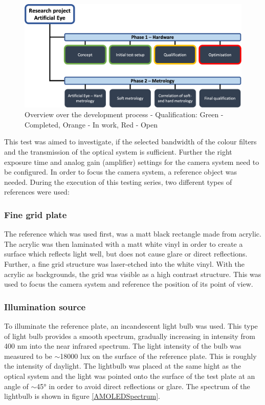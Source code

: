 \begin{figure}[h]
\begin{center}
\includegraphics[width=12cm]{Pictures/ChianQuali}
\caption[Overview over the development process - Qualification]{Overview over the development process - Qualification: Green - Completed, Orange - In work, Red - Open}
\label{ChainQuali}
\end{center}
\end{figure}

This test was aimed to investigate, if the selected bandwidth of the colour filters and the transmission of the optical system is sufficient. Further the right exposure time and analog gain (amplifier) settings for the camera system need to be configured. In order to focus the camera system, a reference object was needed. During the execution of this testing series, two different types of references were used:
\subsubsection{Fine grid plate}
The reference which was used first, was a matt black rectangle made from acrylic. The acrylic was then laminated with a matt white vinyl in order to create a surface which reflects light well, but does not cause glare or direct reflections. Further, a fine grid structure was laser-etched into the white vinyl. With the acrylic as backgrounds, the grid was visible as a high contrast structure. This was used to focus the camera system and reference the position of its point of view.
\subsubsection{Illumination source}
To illuminate the reference plate, an incandescent light bulb was used. This type of light bulb provides a smooth spectrum, gradually increasing in intensity from 400 nm into the near infrared spectrum. The light intensity of the bulb was measured to be $\sim$18000 lux on the surface of the reference plate. This is roughly the intensity of daylight. The lightbulb was placed at the same hight as the optical system and the light was pointed onto the surface of the test plate at an angle of $\sim$45° in order to avoid direct reflections or glare. The spectrum of the lightbulb is shown in figure \ref{AMOLEDSpectrum}. \\

